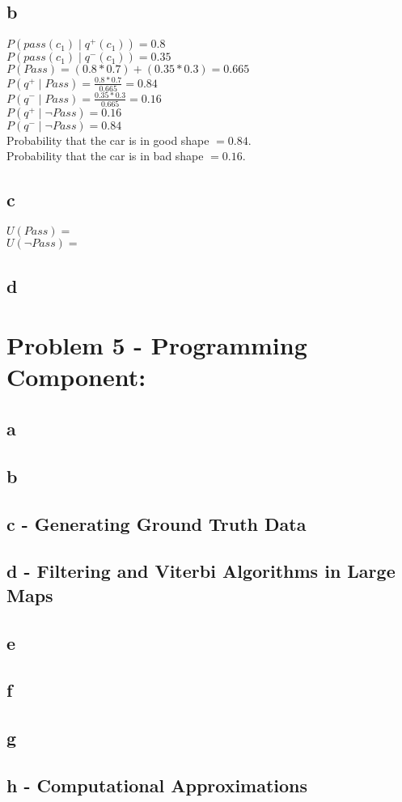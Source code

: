 \documentclass[11pt, oneside]{article}   	%
\begin{document}
\begin{flushleft}
\subsection*{b}
$P(pass(c_1 )\mid q^+ (c_1 )) = 0.8$\\
$P(pass(c_1 )\mid q^- (c_1 )) = 0.35$\\
\medskip
$P(Pass) = (0.8*0.7)+(0.35*0.3) = 0.665$\\
$P(q^+ \mid Pass) = \frac{0.8*0.7}{0.665} = 0.84$\\
$P(q^- \mid Pass) = \frac{0.35*0.3}{0.665} = 0.16$\\
$P(q^+ \mid \neg Pass) = 0.16$\\
$P(q^- \mid \neg Pass) = 0.84$\\
Probability that the car is in good shape $= 0.84$.\\
Probability that the car is in bad shape $= 0.16$.\\
\subsection*{c}
$U(Pass) = $\\
$U(\neg Pass) = $\\
\subsection*{d}
\section*{Problem 5 - Programming Component:}
\subsection*{a}
\subsection*{b}
\subsection*{c - Generating Ground Truth Data}
\subsection*{d - Filtering and Viterbi Algorithms in Large Maps}
\subsection*{e}
\subsection*{f}
\subsection*{g}
\subsection*{h - Computational Approximations}
\end{flushleft}
\end{document}
